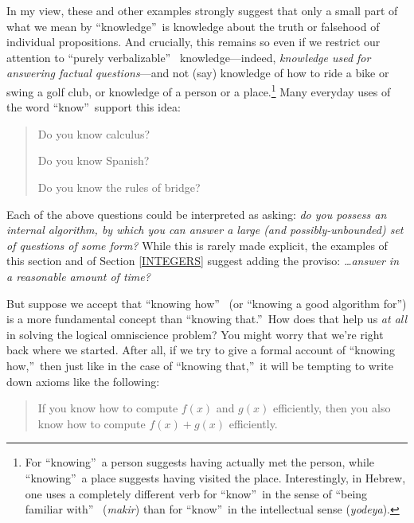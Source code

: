 \documentclass[12pt,onecolumn]{article}%
\begin{document}
In my view, these and other examples strongly suggest that only a small part
of what we mean by \textquotedblleft knowledge\textquotedblright\  is knowledge
about the truth or falsehood of individual propositions. And crucially, this
remains so even if we restrict our attention to \textquotedblleft purely
verbalizable\textquotedblright\ \textit{ }knowledge---indeed, \textit{knowledge
used for answering factual questions}---and not (say) knowledge of how to ride
a bike or swing a golf club, or knowledge of a person or a place.\footnote{For
\textquotedblleft knowing\textquotedblright\  a person suggests having actually
met the person, while \textquotedblleft knowing\textquotedblright\  a place
suggests having visited the place. Interestingly, in Hebrew, one uses a
completely different verb for \textquotedblleft know\textquotedblright\  in the
sense of \textquotedblleft being familiar with\textquotedblright\ %
 (\textit{makir}) than for \textquotedblleft know\textquotedblright\  in the
intellectual sense (\textit{yodeya}).} Many everyday uses of the word
\textquotedblleft know\textquotedblright\  support this idea:

\begin{quotation}
\noindent Do you know calculus?

\noindent Do you know Spanish?

\noindent Do you know the rules of bridge?
\end{quotation}

Each of the above questions could be interpreted as asking: \textit{do you
possess an internal algorithm, by which you can answer a large (and
possibly-unbounded) set of questions of some form? }While this is rarely
made explicit, the examples of this section and of Section \ref{INTEGERS}
suggest adding the proviso: \textit{\ldots answer in a reasonable amount of
time?}

But suppose we accept that \textquotedblleft knowing how\textquotedblright\ %
 (or \textquotedblleft knowing a good algorithm for\textquotedblright ) is a
more fundamental concept than \textquotedblleft knowing
that.\textquotedblright\  How does that help us \textit{at all} in solving
the logical omniscience problem? You might worry that we're right back where
we started. After all, if we try to give a formal account of
\textquotedblleft knowing how,\textquotedblright\  then just like in the case
of \textquotedblleft knowing that,\textquotedblright\  it will be tempting to
write down axioms like the following:

\begin{quotation}
\noindent If you know how to compute $f(x)  $ and $g(
x)  $ efficiently, then you also know how to compute $f(x)
+g(x)  $ efficiently.
\end{quotation}
\end{document}
